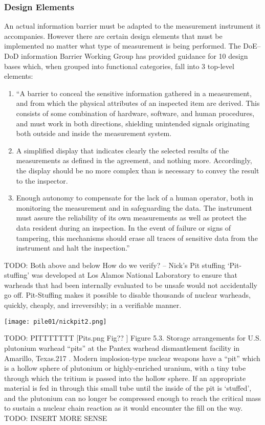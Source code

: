 \documentclass[twoside,titlepage,11pt,twocolumn,a4paper]{article}
\begin{document}
\subsubsection{Design Elements}
An actual information barrier must be adapted to the measurement
instrument it accompanies. However there are certain design elements
that must be implemented no matter what type of measurement is being
performed. The DoE--DoD information Barrier Working Group has provided
guidance for 10 design bases which, when grouped into functional
categories, fall into 3 top-level elements:
\begin{enumerate}
  \item ``A barrier to conceal the sensitive information gathered in a
    measurement, and from which the physical attributes of an
    inspected item are derived. This consists of some combination of
    hardware, software, and human procedures, and must work in both
    directions, shielding unintended signals originating both outside
    and inside the measurement system.
  \item A simplified display that indicates clearly the selected
    results of the measurements as defined in the agreement, and
    nothing more. Accordingly, the display should be no more complex
    than is necessary to convey the result to the inspector.
  \item Enough autonomy to compensate for the lack of a human
    operator, both in monitoring the measurement and in safeguarding
    the data. The instrument must assure the reliability of its own
    measurements as well as protect the data resident during an
    inspection. In the event of failure or signs of tampering, this
    mechanisms should erase all traces of sensitive data from the
    instrument and halt the inspection.'' \citep{depDoE1999}
\end{enumerate}

TODO: Both above and below
How do we verify? -- Nick’s Pit stuffing `Pit-stuffing' was developed
at Los Alamos National Laboratory to ensure that warheads that had
been internally evaluated to be unsafe would not accidentally go
off. Pit-Stuffing makes it possible to disable thousands of nuclear
warheads, quickly, cheaply, and irreversibly; in a verifiable manner.

\begin{figure*}
  \texttt{[image: pile01/nickpit2.png]}
\end{figure*}

TODO: PITTTTTTT
[Pits.png Fig?? ] Figure 5.3. Storage arrangements for U.S. plutonium
warhead ``pits'' at the Pantex warhead dismantlement facility in
Amarillo, Texas.217 \citep{IPFN2009}. Modern
implosion-type nuclear weapons have a ``pit'' which is a hollow sphere
of plutonium or highly-enriched uranium, with a tiny tube through
which the tritium is passed into the hollow sphere. If an appropriate
material is fed in through this small tube until the inside of the pit
is ‘stuffed’, and the plutonium can no longer be compressed enough to
reach the critical mass to sustain a nuclear chain reaction as it
would encounter the fill on the way.
TODO: INSERT MORE SENSE
\end{document}
